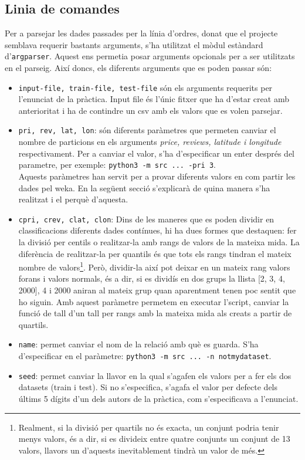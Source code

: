 \subsection{Linia de comandes}
Per a parsejar les dades passades per la línia d'ordres, donat que el projecte semblava
requerir bastants arguments, s'ha utilitzat el mòdul estàndard d'\texttt{argparser}. Aquest
ens permetia posar arguments opcionals per a ser utilitzats en el parseig. Així doncs, els
diferents arguments que es poden passar són:
\begin{itemize}
	\item \texttt{input-file, train-file, test-file} són els arguments requerits per l'enunciat de la pràctica.
		Input file és l'únic fitxer que ha d'estar creat amb anterioritat i ha de contindre un csv amb els
		valors que es volen parsejar. 
	\item \texttt{pri, rev, lat, lon}: són diferents paràmetres que permeten canviar el nombre de particions en els arguments \textit{price, reviews, latitude i longitude} respectivament. Per a
	canviar el valor, s'ha d'especificar un enter després del parametre, per exemple:
	\verb|python3 -m src ... -pri 3|.\\
	Aquests paràmetres han servit per a provar diferents valors en com partir les dades pel weka.
	En la següent secció s'explicarà de quina manera s'ha realitzat i el perquè d'aquesta.
	\item \texttt{cpri, crev, clat, clon}: Dins de les maneres que es poden dividir en classificacions 
	diferents dades contínues, hi ha dues formes que destaquen: fer la divisió per centils o realitzar-la
	amb rangs de valors de la mateixa mida. La diferència de realitzar-la per quantils és que tots
	els rangs tindran el mateix nombre de valors\footnote{Realment, si la divisió per quartils no
	és exacta, un conjunt podria tenir menys valors, és a dir, si es divideix entre quatre conjunts un
	conjunt de 13 valors, llavors un d'aquests inevitablement tindrà un valor de més.}. Però, dividir-la
	així pot deixar en un mateix rang valors forans i valors normals, és a dir, si es dividís en dos
	grups la llista [2, 3, 4, 2000], 4 i 2000 aniran al mateix grup quan aparentment tenen poc sentit
	que ho siguin. Amb aquest paràmetre permetem en executar l'script, canviar la funció de tall
	d'un tall per rangs amb la mateixa mida als creats a partir de quartils.
	\item \texttt{name}: permet canviar el nom de la relació amb què es guarda. S'ha d'especificar
	en el paràmetre: \verb|python3 -m src ... -n notmydataset|.
	\item \texttt{seed}: permet canviar la llavor en la qual s'agafen els valors per a fer els dos
	datasets (train i test). Si no s'especifica, s'agafa el valor per defecte dels últims 5 dígits d'un
	dels autors de la pràctica, com s'especificava a l'enunciat.
\end{itemize}
